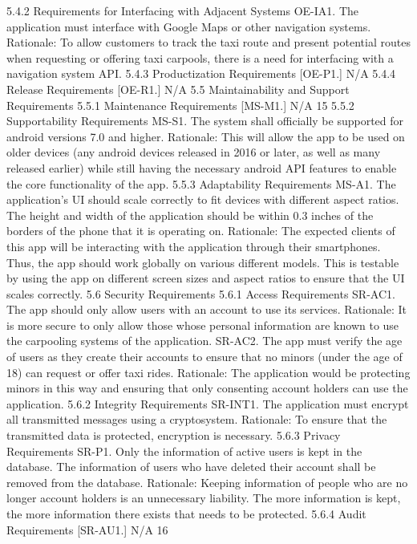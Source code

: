 5.4.2 Requirements for Interfacing with Adjacent Systems
OE-IA1. The application must interface with Google Maps or other navigation systems.
Rationale: To allow customers to track the taxi route and present potential routes when requesting or offering taxi carpools, there is a need for interfacing with a navigation system API.
5.4.3 Productization Requirements
[OE-P1.] N/A
5.4.4 Release Requirements
[OE-R1.] N/A
5.5 Maintainability and Support Requirements
5.5.1 Maintenance Requirements
[MS-M1.] N/A
15
5.5.2 Supportability Requirements
MS-S1. The system shall officially be supported for android versions 7.0 and higher.
Rationale: This will allow the app to be used on older devices (any android devices released
in 2016 or later, as well as many released earlier) while still having the necessary android API
features to enable the core functionality of the app.
5.5.3 Adaptability Requirements
MS-A1. The application’s UI should scale correctly to fit devices with different aspect ratios.
The height and width of the application should be within 0.3 inches of the borders of the phone
that it is operating on.
Rationale: The expected clients of this app will be interacting with the application through
their smartphones. Thus, the app should work globally on various different models. This is
testable by using the app on different screen sizes and aspect ratios to ensure that the UI scales
correctly.
5.6 Security Requirements
5.6.1 Access Requirements
SR-AC1. The app should only allow users with an account to use its services.
Rationale: It is more secure to only allow those whose personal information are known to use
the carpooling systems of the application.
SR-AC2. The app must verify the age of users as they create their accounts to ensure that no
minors (under the age of 18) can request or offer taxi rides.
Rationale: The application would be protecting minors in this way and ensuring that only
consenting account holders can use the application.
5.6.2 Integrity Requirements
SR-INT1. The application must encrypt all transmitted messages using a cryptosystem.
Rationale: To ensure that the transmitted data is protected, encryption is necessary.
5.6.3 Privacy Requirements
SR-P1. Only the information of active users is kept in the database. The information of users
who have deleted their account shall be removed from the database.
Rationale: Keeping information of people who are no longer account holders is an unnecessary
liability. The more information is kept, the more information there exists that needs to be
protected.
5.6.4 Audit Requirements
[SR-AU1.] N/A
16
